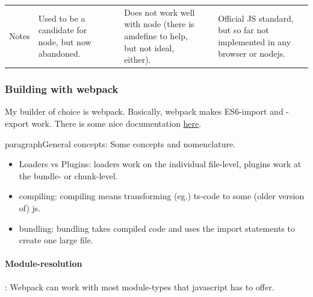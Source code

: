 \begin{adjustbox}{width=1.2\linewidth,center}
\begin{table}[ht]
\begin{tabularx}{1.2\textwidth}{XXXXXX}
            Notes           & Used to be a candidate for node, but now abandoned.                 &                                                                          & Does not work well with node (there is amdefine to help, but not ideal, either). &                                                               & Official JS standard, but so far not implemented in any browser or nodejs.
        \end{tabularx}
    \end{table}
\end{adjustbox}

    

\subsubsection{Building with webpack}
My builder of choice is webpack. Basically, webpack makes ES6-import and -export work. There is some nice documentation \href{https://what-problem-does-it-solve.com/webpack/index.html}{here}.

paragraph{General concepts}: Some concepts and nomenclature.

\begin{itemize}
    \item Loaders vs Plugins: loaders work on the individual file-level, plugins work at the bundle- or chunk-level.
    \item compiling: compiling means transforming (eg.) ts-code to some (older version of) js.
    \item bundling: bundling takes compiled code and uses the import statements to create one large file.
\end{itemize}

\paragraph{Module-resolution}: Webpack can work with most module-types that javascript has to offer.

